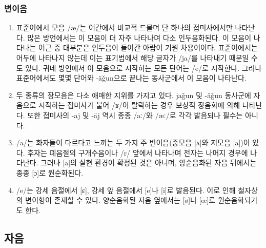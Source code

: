 \subsubsection{변이음}
\begin{enumerate}
	\item 표준어에서 모음 /æ/는 어간에서 비교적 드물며 단 하나의 접미사에서만 나타난다. 많은 방언에서는 이 모음이 더 자주 나타나며 다소 인두음화된다. 이 모음이 나타나는 어근 중 대부분은 인두음이 들어간 아랍어 기원 차용어이다. 표준어에서는 어두에 나타나지 않는데 이는 표기법에서 해당 글자가 /ja/를 나타내기 때문일 수도 있다. 귀네 방언에서 이 모음으로 시작하는 모든 단어는 /e/로 시작한다. 그러나 표준어에서도 몇몇 단어와 -äǧun으로 끝나는 동사군에서 이 모음이 나타난다.
	\item 두 종류의 장모음은 다소 애매한 지위를 가지고 있다. jaǧun 및 -äǧun 동사군에 자음으로 시작하는 접미사가 붙어 /ʁ/이 탈락하는 경우 보상적 장음화에 의해 나타난다. 또한 접미사의 -aj 및 -äj 역시 종종 /aː/와 /æː/로 각각 발음되나 필수는 아니다.
	\item /a/는 화자들이 다르다고 느끼는 두 가지 주 변이음(중모음 [ʌ]와 저모음 [a])이 있다. 후자는 폐음절의 구개수음이나 /r/ 앞에서 나타나며 전자는 나머지 경우에 나타난다. 그러나 [a]의 실현 환경이 확정된 것은 아니며, 양순음화된 자음 뒤에서는 종종 [ɔ]로 원순화된다.
	\item /e/는 강세 음절에서 [ɛ], 강세 앞 음절에서 [e]나 [i]로 발음된다. 이로 인해 철자상의 변이형이 존재할 수 있다. 양순음화된 자음 옆에서는 [ø]나 [œ]로 원순음화되기도 한다.
\end{enumerate}
\subsection{자음}
